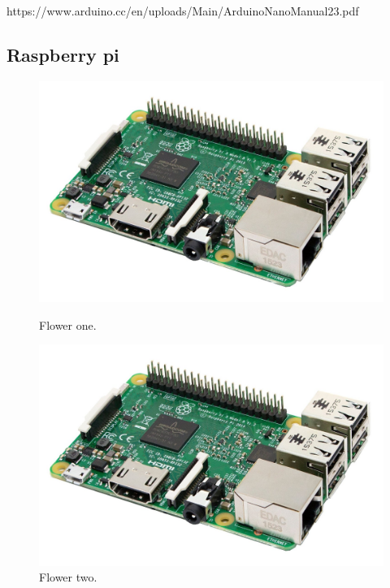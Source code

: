 https://www.arduino.cc/en/uploads/Main/ArduinoNanoManual23.pdf


\newpage

\subsection{Raspberry pi }


\begin{figure}[h]
	\centering
	\begin{minipage}[b]{0.4\textwidth}
		\includegraphics[width=\textwidth]{img/hardware/rasp3-img.jpg}
		\caption{Flower one.}
	\end{minipage}
	\hfill
	\begin{minipage}[b]{0.4\textwidth}
		\includegraphics[width=\textwidth]{img/hardware/rasp3-img.jpg}
		\caption{Flower two.}
	\end{minipage}
\end{figure}


